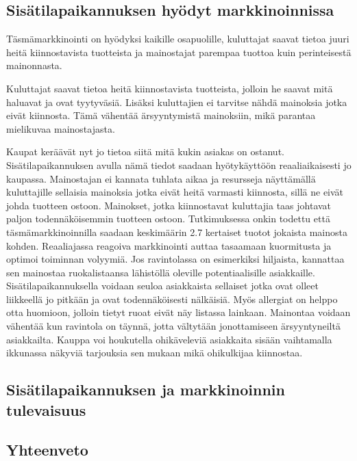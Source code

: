 \subsection{Sisätilapaikannuksen hyödyt markkinoinnissa}
Täsmämarkkinointi on hyödyksi kaikille osapuolille, kuluttajat saavat tietoa juuri heitä kiinnostavista tuotteista ja mainostajat parempaa tuottoa kuin perinteisestä mainonnasta.


Kuluttajat saavat tietoa heitä kiinnostavista tuotteista, jolloin he saavat mitä haluavat ja ovat tyytyväsiä. Lisäksi kuluttajien ei tarvitse nähdä mainoksia jotka eivät kiinnosta. Tämä vähentää ärsyyntymistä mainoksiin, mikä parantaa mielikuvaa mainostajasta.
 

Kaupat keräävät nyt jo tietoa siitä mitä kukin asiakas on ostanut. Sisätilapaikannuksen avulla nämä tiedot saadaan hyötykäyttöön reaaliaikaisesti jo kaupassa.
Mainostajan ei kannata tuhlata aikaa ja resursseja näyttämällä kuluttajille sellaisia mainoksia jotka eivät heitä varmasti kiinnosta, sillä ne eivät johda tuotteen ostoon. Mainokset, jotka kiinnostavat kuluttajia taas johtavat paljon todennäköisemmin tuotteen ostoon. Tutkimuksessa\cite{target} onkin todettu että täsmämarkkinoinnilla saadaan keskimäärin 2.7 kertaiset tuotot jokaista mainosta kohden.
Reaaliajassa reagoiva markkinointi auttaa tasaamaan kuormitusta ja optimoi toiminnan volyymiä\cite{tasma}. Jos ravintolassa on esimerkiksi hiljaista, kannattaa sen mainostaa ruokalistaansa lähistöllä oleville potentiaalisille asiakkaille. Sisätilapaikannuksella voidaan seuloa asiakkaista sellaiset jotka ovat olleet liikkeellä jo pitkään ja ovat todennäköisesti nälkäisiä. Myös allergiat on helppo otta huomioon, jolloin tietyt ruoat eivät näy listassa lainkaan\cite{tasma}. Mainontaa voidaan vähentää kun ravintola on täynnä, jotta vältytään jonottamiseen ärsyyntyneiltä asiakkailta.
Kauppa voi houkutella ohikäveleviä asiakkaita sisään vaihtamalla ikkunassa näkyviä tarjouksia sen mukaan mikä ohikulkijaa kiinnostaa.
\subsection{Sisätilapaikannuksen ja markkinoinnin tulevaisuus}
\subsection{Yhteenveto}
